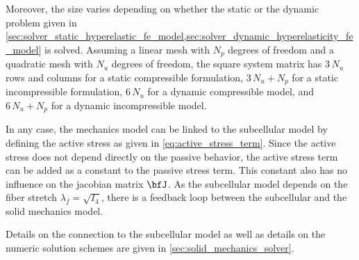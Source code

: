 Moreover, the size varies depending on whether the static or the dynamic problem given in \cref{sec:solver_static_hyperelastic_fe_model,sec:solver_dynamic_hyperelasticity_fe_model} is solved. Assuming a linear mesh with $N_p$ degrees of freedom and a quadratic mesh with $N_u$ degrees of freedom, the square system matrix has $3\,N_u$ rows and columns for a static compressible formulation, $3\,N_u + N_p$ for a static incompressible formulation, $6\,N_u$ for a dynamic compressible model, and $6\,N_u+N_p$ for a dynamic incompressible model.



In any case, the mechanics model can be linked to the subcellular model by defining the active stress as given in \cref{eq:active_stress_term}. Since the active stress does not depend directly on the passive behavior, the active stress term can be added as a constant to the passive stress term. This constant also has no influence on the jacobian matrix $\bfJ$. As the subcellular model depends on the fiber stretch $\lambda_f = \sqrt{I_4}$, there is a feedback loop between the subcellular and the solid mechanics model.

Details on the connection to the subcellular model as well as details on the numeric solution schemes are given in \cref{sec:solid_mechanics_solver}.



